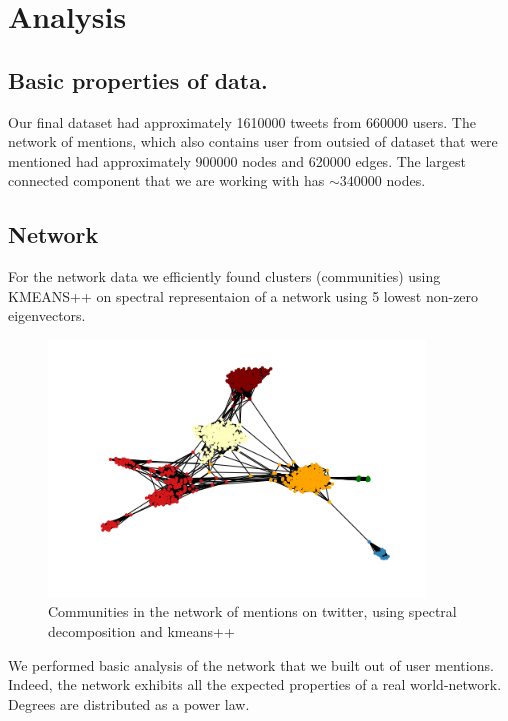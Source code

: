 \documentclass[%
 reprint,
 amsmath,amssymb,
 aps,
]{revtex4-1}
\begin{document}
\section{Analysis}

\subsection{Basic properties of data.}

Our final dataset had approximately 1610000 tweets from 660000 users. The network of mentions, which also contains user from outsied of dataset that were mentioned had approximately 900000 nodes and 620000 edges. The largest connected component that we are working with has $\sim 340000$ nodes.



\subsection{Network}

For the network data we efficiently found clusters (communities) using KMEANS++ on spectral representaion of a network using 5 lowest non-zero eigenvectors.

\begin{figure}[htp]
\centering
\includegraphics[width=10cm]{communities}
\caption{Communities in the network of mentions on twitter, using spectral decomposition and kmeans++}
\label{fig}
\end{figure}


We performed basic analysis of the network that we built out of user mentions. Indeed, the network exhibits all the expected properties of a real world-network. Degrees are distributed as a power law.
\end{document}
